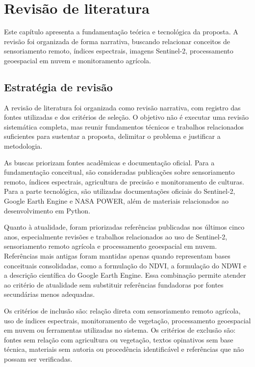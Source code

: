\chapter{Revisão de literatura}\label{chap:revisao}

Este capítulo apresenta a fundamentação teórica e tecnológica da proposta. A revisão foi organizada de forma narrativa, buscando relacionar conceitos de sensoriamento remoto, índices espectrais, imagens Sentinel-2, processamento geoespacial em nuvem e monitoramento agrícola.

\section{Estratégia de revisão}

A revisão de literatura foi organizada como revisão narrativa, com registro das fontes utilizadas e dos critérios de seleção. O objetivo não é executar uma revisão sistemática completa, mas reunir fundamentos técnicos e trabalhos relacionados suficientes para sustentar a proposta, delimitar o problema e justificar a metodologia.

As buscas priorizam fontes acadêmicas e documentação oficial. Para a fundamentação conceitual, são consideradas publicações sobre sensoriamento remoto, índices espectrais, agricultura de precisão e monitoramento de culturas. Para a parte tecnológica, são utilizadas documentações oficiais do Sentinel-2, Google Earth Engine e NASA POWER, além de materiais relacionados ao desenvolvimento em Python.

Quanto à atualidade, foram priorizadas referências publicadas nos últimos cinco anos, especialmente revisões e trabalhos relacionados ao uso de Sentinel-2, sensoriamento remoto agrícola e processamento geoespacial em nuvem. Referências mais antigas foram mantidas apenas quando representam bases conceituais consolidadas, como a formulação do NDVI, a formulação do NDWI e a descrição científica do Google Earth Engine. Essa combinação permite atender ao critério de atualidade sem substituir referências fundadoras por fontes secundárias menos adequadas.

Os critérios de inclusão são: relação direta com sensoriamento remoto agrícola, uso de índices espectrais, monitoramento de vegetação, processamento geoespacial em nuvem ou ferramentas utilizadas no sistema. Os critérios de exclusão são: fontes sem relação com agricultura ou vegetação, textos opinativos sem base técnica, materiais sem autoria ou procedência identificável e referências que não possam ser verificadas.

